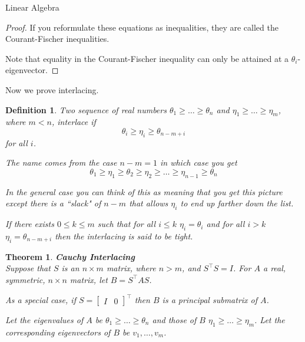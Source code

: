 \documentclass{article}
\newtheorem{thm}{Theorem}
\newtheorem{defn}{Definition}
\begin{document}
\begin{section}{Linear Algebra}
\begin{proof}
    If you reformulate these equations as inequalities, they are called the Courant-Fischer inequalities.

    Note that equality in the Courant-Fischer inequality can only be attained at a $\theta_i$-eigenvector.

  \end{proof}

  Now we prove interlacing.

  \begin{defn}
    Two sequence of real numbers $\theta_1 \geq \ldots \geq \theta_n$ and $\eta_1 \geq \ldots \geq \eta_m$, where $m < n$, \emph{interlace} if
    $$
    \theta_i \geq \eta_i \geq \theta_{n-m+i}
    $$
    for all $i$.

    The name comes from the case $n - m = 1$ in which case you get
    $$
    \theta_1 \geq \eta_1 \geq \theta_2 \geq \eta_2 \geq \ldots \geq \eta_{n-1} \geq \theta_n
    $$

    In the general case you can think of this as meaning that you get this picture except there is a ``slack" of $n-m$ that allows $\eta_i$ to end up farther down the list.

    If there exists $0 \leq k \leq m$ such that for all $i \leq k$ $\eta_i = \theta_i$ and for all $i > k$ $\eta_i = \theta_{n-m+i}$ then the interlacing is said to be \emph{tight}.
  \end{defn}

  \begin{thm}{\textbf{Cauchy Interlacing}\\}
    Suppose that $S$ is an $n\times m$ matrix, where $n > m$, and $S^\intercal S = I$.
    For $A$ a real, symmetric, $n \times n$ matrix, let $B = S^\intercal A S$.

    As a special case, if $S = \begin{bmatrix} I & 0 \end{bmatrix}^\intercal$ then $B$ is a principal submatrix of $A$.

    Let the eigenvalues of $A$ be $\theta_1 \geq \ldots \geq \theta_n$ and those of $B$ $\eta_1 \geq \ldots \geq \eta_m$.
    Let the corresponding eigenvectors of $B$ be $v_1, \ldots, v_m$.
    

\end{thm}
\end{section}
\end{document}
